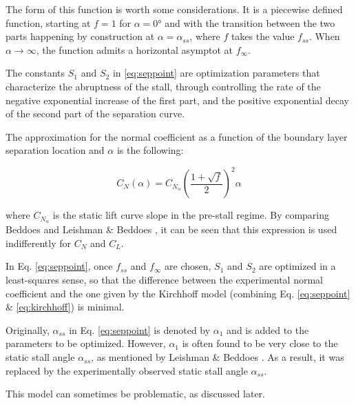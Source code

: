 The form of this function is worth some considerations. It is a piecewise defined function, starting at $f=1$ for $\alpha=\ang{0}$ and with the transition between the two parts happening by construction at $\alpha=\alpha_{ss}$, where $f$ takes the value $f_{ss}$.
When $\alpha \rightarrow \infty$, the function admits a horizontal asymptot at $f_{\infty}$.

The constants $S_1$ and $S_2$ in \eqref{eq:seppoint} are optimization parameters that characterize the abruptness of the stall, through controlling the rate of the negative exponential increase of the first part, and the positive exponential decay of the second part of the separation curve. 

The approximation for the normal coefficient as a function of the boundary layer separation location and $\alpha$ is the following: 

\begin{equation}
	C_N (\alpha) = C_ {N_{\alpha}} \left(\frac{1+\sqrt{f}}{2}\right)^2 \alpha
	\label{eq:kirchhoff}
\end{equation}

\noindent where $C_{N_\alpha}$ is the static lift curve slope in the pre-stall regime. By comparing Beddoes \cite{beddoes_representation_1983} and Leishman \& Beddoes \cite{leishman_semi-empirical_1989}, it can be seen that this expression is used indifferently for $C_N$ and $C_L$.

In Eq. \eqref{eq:seppoint}, once $f_{ss}$ and $f_\infty$ are chosen, $S_1$ and $S_2$ are optimized in a least-squares sense, so that the difference between the experimental normal coefficient and the one given by the Kirchhoff model (combining Eq. \eqref{eq:seppoint} \& \eqref{eq:kirchhoff}) is minimal.

Originally, $\alpha_{ss}$ in Eq. \ref{eq:seppoint} is denoted by $\alpha_1$ and is added to the parameters to be optimized. However, $\alpha_1$ is often found to be very close to the static stall angle $\alpha_{ss}$, as mentioned by Leishman \& Beddoes \cite{leishman_semi-empirical_1989}. As a result, it was replaced by the experimentally observed static stall angle $\alpha_{ss}$. 

This model can sometimes be problematic, as discussed later.

\iffalse
\begin{tikzpicture}[
	nonterminal/.style={
		rectangle,
		minimumsize=6mm,
		very thick,
		draw=black,
		color=white,						
	}]
	\node [nonterminal] {\alpha}
\end{tikzpicture}
\fi

